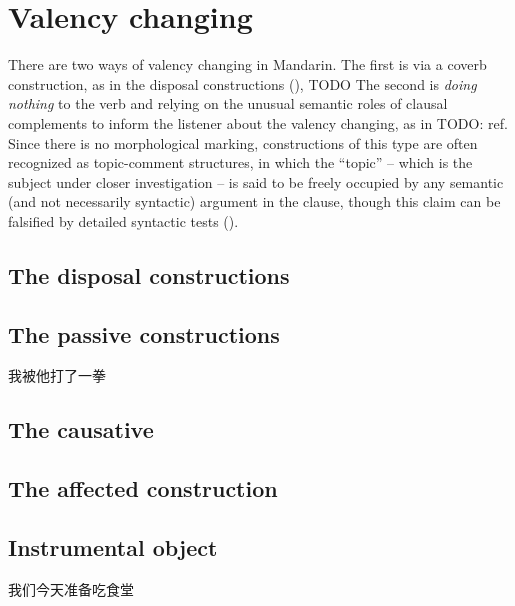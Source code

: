 \documentclass[UTF8, a4paper, oneside, scheme=plain]{ctexrep}
\begin{document}
\chapter{Valency changing}

There are two ways of valency changing in Mandarin.
The first is via a coverb construction, 
as in the disposal constructions (),
TODO 
The second is \emph{doing nothing} to the verb 
and relying on the unusual semantic roles of clausal complements 
to inform the listener about the valency changing,
as in TODO: ref.
Since there is no morphological marking,
constructions of this type are often recognized as topic-comment structures,
in which the ``topic'' -- which is the subject under closer investigation -- 
is said to be freely occupied by any semantic (and not necessarily syntactic) argument in the clause,
though this claim can be falsified by detailed syntactic tests ().

\section{The disposal constructions}\label{sec:disposal-construction}

\section{The passive constructions}\label{sec:affected-construction}

\begin{exe}
    \ex 我被他打了一拳
\end{exe}

\section{The causative}

\section{The affected construction}



\section{Instrumental object}

\begin{exe}
    \ex 我们今天准备吃食堂
\end{exe}
\end{document}
